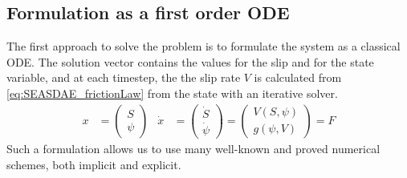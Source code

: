 \subsection{Formulation as a first order ODE}
The first approach to solve the problem is to formulate the system as a classical ODE. The solution vector contains the values for the slip and for the state variable, and at each timestep, the the slip rate $V$ is calculated from \autoref{eq:SEASDAE_frictionLaw} from the state with an iterative solver.
\begin{align}
	\label{eq:ODE_formulation_SEAS}
	x &= \begin{pmatrix}
		S \\ \psi
	\end{pmatrix} & \dot{x} &= \begin{pmatrix}
								  \dot{S} \\ \dot{\psi}
							   \end{pmatrix} = \begin{pmatrix}
												   V(S,\psi) \\ g(\psi, V)
											   \end{pmatrix} = F
\end{align} 
Such a formulation allows us to use many well-known and proved numerical schemes, both implicit and explicit. 

